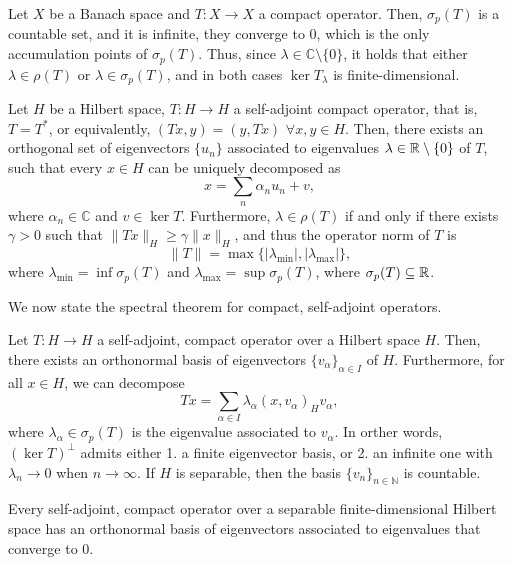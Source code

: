 \begin{theorem}
    Let $X$ be a Banach space and $T:X\to X$ a compact operator. Then, $\sigma_p(T)$ is a countable set, and it is infinite, they converge to $0$, which is the only accumulation points of $\sigma_p(T)$. Thus, since $\lambda\in\mathbb{C}\setminus\{0\}$, it holds that either $\lambda\in\rho(T)$ or $\lambda\in\sigma_p(T)$, and in both cases $\ker T_\lambda$ is finite-dimensional. 
\end{theorem}
\begin{theorem}
    Let $H$ be a Hilbert space, $T:H\to H$ a self-adjoint compact operator, that is, $T=T^*$, or equivalently, $(Tx,y)=(y,Tx)$ $\forall x,y\in H$. Then, there exists an orthogonal set of eigenvectors $\{u_n\}$ associated to eigenvalues $\lambda\in\mathbb{R}\setminus\{0\}$ of $T$, such that every $x\in H$ can be uniquely decomposed as 
    \begin{equation*}
        x = \sum_n \alpha_n u_n + v,
    \end{equation*}
    where $\alpha_n\in\mathbb{C}$ and $v\in\ker T$. Furthermore, $\lambda\in\rho(T)$ if and only if there exists $\gamma>0$ such that $\|Tx\|_H\geq \gamma\|x\|_H$, and thus the operator norm of $T$ is 
    \begin{equation*}
        \|T\| = \max\{|\lambda_{\text{min}}|, |\lambda_{\text{max}}|\},
    \end{equation*}
    where $\lambda_{\text{min}} = \inf \sigma_p(T)$ and $\lambda_{\text{max}} = \sup \sigma_p(T)$, where $\sigma_p(T)\subseteq\mathbb{R}$. 
\end{theorem}

We now state the spectral theorem for compact, self-adjoint operators. 
\begin{theorem}
    Let $T:H\to H$ a self-adjoint, compact operator over a Hilbert space $H$. Then, there exists an orthonormal basis of eigenvectors $\{v_\alpha\}_{\alpha\in I}$ of $H$. Furthermore, for all $x\in H$, we can decompose 
    \begin{equation*}
        Tx = \sum_{\alpha\in I} \lambda_\alpha(x,v_\alpha)_Hv_\alpha,
    \end{equation*}
    where $\lambda_\alpha\in\sigma_p(T)$ is the eigenvalue associated to $v_\alpha$. In orther words, $(\ker T)^\bot$ admits either 1. a finite eigenvector basis, or 2. an infinite one with $\lambda_n\to 0$ when $n\to\infty$. If $H$ is separable, then the basis $\{v_n\}_{n\in \mathbb{N}}$ is countable.
\end{theorem}
\begin{lemma}
    Every self-adjoint, compact operator over a separable finite-dimensional Hilbert space has an orthonormal basis of eigenvectors associated to eigenvalues that converge to $0$. 
\end{lemma}
